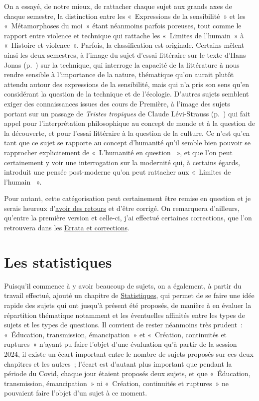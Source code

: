 On a essayé, de notre mieux, de rattacher chaque sujet aux grands axes de chaque semestre, la distinction entre les «~Expressions de la sensibilité~» et les «~Métamorphoses du moi~» étant néanmoins parfois poreuses, tout comme le rapport entre violence et technique qui rattache les «~Limites de l'humain~» à «~Histoire et violence~». Parfois, la classification est originale. Certains mêlent ainsi les deux semestres, à l'image du sujet d'essai littéraire sur le texte d'Hans Jonas (p.~\pageref{jonas-amérique2021}) sur la technique, qui interroge la capacité de la littérature à nous rendre sensible à l'importance de la nature, thématique qu'on aurait plutôt attendu autour des expressions de la sensibilité, mais qui n'a pris son sens qu'en considérant la question de la technique et de l'écologie. D'autres sujets semblent exiger des connaissances issues des cours de Première, à l'image des sujets portant sur un passage de \textit{Tristes tropiques} de Claude Lévi-Strauss (p.~\pageref{lévi-strauss-liban2022}) qui fait appel pour l'interprétation philosophique au concept de monde et à la question de la découverte, et pour l'essai littéraire à la question de la culture. Ce n'est qu'en tant que ce sujet se rapporte au concept d'humanité qu'il semble bien pouvoir se rapprocher explicitement de «~L'humanité en question ~», et que l'on peut certainement y voir une interrogation sur la modernité qui, à certains égards, introduit une pensée post-moderne qu'on peut rattacher aux «~Limites de l'humain ~».

Pour autant, cette catégorisation peut certainement être remise en question et je serais heureux d'\href{mailto:mikael.quesseveur@ac-lille.fr}{avoir des retours} et d'être corrigé. On remarquera d'ailleurs, qu'entre la première version et celle-ci, j'ai effectué certaines corrections, que l'on retrouvera dans les 
\hyperlink{errata}{Errata et corrections}.

\section*{Les statistiques}

Puisqu'il commence à y avoir beaucoup de sujets, on a également, à partir du travail effectué, ajouté un chapitre de \hyperlink{statistiques}{Statistiques}, qui permet de se faire une idée rapide des sujets qui ont jusqu'à présent été proposés, de manière à en évaluer la répartition thématique notamment et les éventuelles affinités entre les types de sujets et les types de questions. Il convient de rester néanmoins très prudent~: «~Éducation, transmission, émancipation~»{} et «~Création, continuités et ruptures~»{} n'ayant pu faire l'objet d'une évaluation qu'à partir de la session 2024, il existe un écart important entre le nombre de sujets proposés sur ces deux chapitres et les autres~; l'écart est d'autant plus important que pendant la période du Covid, chaque jour étaient proposés deux sujets, et que «~Éducation, transmission, émancipation~»{} ni «~Création, continuités et ruptures~»{} ne pouvaient faire l'objet d'un sujet à ce moment.

